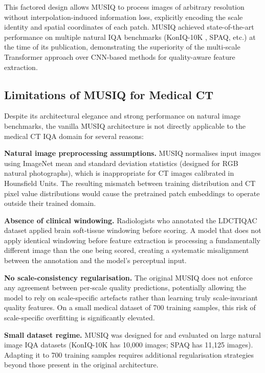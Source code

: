 This factored design allows MUSIQ to process images of arbitrary resolution without
interpolation-induced information loss, explicitly encoding the scale identity and spatial
coordinates of each patch. MUSIQ achieved state-of-the-art performance on multiple
natural IQA benchmarks (KonIQ-10K \cite{hosu2020koniq}, SPAQ, etc.) at the time of its
publication, demonstrating the superiority of the multi-scale Transformer approach over
CNN-based methods for quality-aware feature extraction.

\subsection{Limitations of MUSIQ for Medical CT}
\label{subsec:musiq_limitations}

Despite its architectural elegance and strong performance on natural image benchmarks,
the vanilla MUSIQ architecture is not directly applicable to the medical CT IQA domain
for several reasons:

\textbf{Natural image preprocessing assumptions.} MUSIQ normalises input images using
ImageNet mean and standard deviation statistics (designed for RGB natural photographs),
which is inappropriate for CT images calibrated in Hounsfield Units. The resulting
mismatch between training distribution and CT pixel value distributions would cause the
pretrained patch embeddings to operate outside their trained domain.

\textbf{Absence of clinical windowing.} Radiologists who annotated the LDCTIQAC dataset
applied brain soft-tissue windowing before scoring. A model that does not apply identical
windowing before feature extraction is processing a fundamentally different image than the
one being scored, creating a systematic misalignment between the annotation and the model's
perceptual input.

\textbf{No scale-consistency regularisation.} The original MUSIQ does not enforce any
agreement between per-scale quality predictions, potentially allowing the model to rely
on scale-specific artefacts rather than learning truly scale-invariant quality features.
On a small medical dataset of 700 training samples, this risk of scale-specific
overfitting is significantly elevated.

\textbf{Small dataset regime.} MUSIQ was designed for and evaluated on large natural image
IQA datasets (KonIQ-10K has 10,000 images; SPAQ has 11,125 images). Adapting it to 700
training samples requires additional regularisation strategies beyond those present in
the original architecture.

